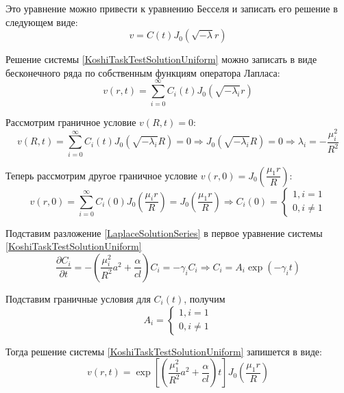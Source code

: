 \documentclass[a4paper,14pt,russian, fleqn]{extreport}
\begin{document}
	Это уравнение можно привести к уравнению Бесселя и записать его решение в следующем виде:
	\begin{equation*}
		v = C(t)J_0\left( \sqrt{-\lambda}r \right)
	\end{equation*}
	
	Решение системы \eqref{KoshiTaskTestSolutionUniform} можно записать в виде бесконечного ряда по собственным функциям оператора Лапласа:
	\begin{equation}\label{LaplaceSolutionSeries}
		v(r,t) = \sum\limits^{\infty}_{i=0} C_i(t)J_0\left(\sqrt{-\lambda_i}r\right)
	\end{equation}
	
	Рассмотрим граничное условие $v(R,t) = 0$:
	\begin{equation*}
		v(R,t) = \sum\limits^{\infty}_{i=0} C_i(t)J_0\left(\sqrt{-\lambda_i}R\right) = 0 \Rightarrow J_0\left(\sqrt{-\lambda_i}R\right) = 0 \Rightarrow \lambda_i = -\dfrac{\mu_i^2}{R^2}
	\end{equation*}
	
	Теперь рассмотрим другое граничное условие $v(r,0) = J_0\left(\dfrac{\mu_1 r}{R}\right)$:
	\begin{equation*}
		v(r,0) = \sum\limits^{\infty}_{i=0} C_i(0)J_0\left(\dfrac{\mu_i r}{R}\right) = J_0\left(\dfrac{\mu_1 r}{R}\right) \Rightarrow C_i(0) = \left\{\begin{array}{c}
			1, i = 1 \\
			0, i \ne 1
		\end{array}\right.
	\end{equation*}
	
	Подставим разложение \eqref{LaplaceSolutionSeries} в первое уравнение системы \eqref{KoshiTaskTestSolutionUniform}
	\begin{equation*}\label{key}
	\dfrac{\partial C_i}{\partial t} = - \left ( \dfrac{\mu_i^2}{R^2}a^2 + \dfrac{\alpha}{cl} \right) C_i = -\gamma_i C_i \Rightarrow C_i = A_i \exp{\left( -\gamma_i t \right)}
	\end{equation*}
	
	Подставим граничные условия для $C_i(t)$, получим
	\begin{equation*}
		A_i = \left\{\begin{array}{c}
		1, i = 1 \\
		0, i \ne 1
		\end{array}\right.
	\end{equation*}
	
	Тогда решение системы \eqref{KoshiTaskTestSolutionUniform} запишется в виде:
	\begin{equation*}
		v(r,t) = \exp{\left[ \left ( \dfrac{\mu_1^2}{R^2}a^2 + \dfrac{\alpha}{cl} \right)t \right]}J_0 \left( \dfrac{\mu_1 r}{R}\right)
	\end{equation*}
	
\end{document}

